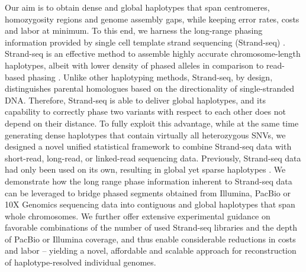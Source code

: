 Our aim is to obtain dense and global haplotypes that span centromeres, homozygosity regions and genome assembly gaps, while keeping error rates, costs and labor at minimum. 
To this end, we harness the long-range phasing information provided by single cell template strand sequencing (Strand-seq) \citep{falconer2012dna, sanders2017single}. Strand-seq is an effective method to assemble highly 
accurate chromosome-length haplotypes, albeit with lower density of phased alleles in comparison to read-based phasing \citep{Porubsky2016}. 
Unlike other haplotyping methods, Strand-seq, by design, distinguishes parental homologues based on the directionality of single-stranded DNA. 
Therefore, Strand-seq is able to deliver global haplotypes, and its capability to correctly phase two variants with respect to each other does not depend on their distance. 
To fully exploit this advantage, while at the same time generating dense haplotypes that contain virtually all heterozygous SNVs, we designed a novel unified statistical framework to combine 
Strand-seq data with short-read, long-read, or linked-read sequencing data. 
Previously, Strand-seq data had only been used on its own, resulting in global yet sparse haplotypes \citep{Porubsky2016}. 
We demonstrate how the long range phase information inherent to Strand-seq data can be leveraged to bridge phased segments obtained from Illumina, PacBio or 10X Genomics sequencing data into contiguous and global haplotypes that span whole chromosomes.
We further offer extensive experimental guidance on favorable combinations of the number of used Strand-seq libraries and the depth of PacBio or Illumina coverage, 
and thus enable considerable reductions in costs and labor – yielding a novel, affordable and scalable approach for reconstruction of haplotype-resolved individual genomes.
